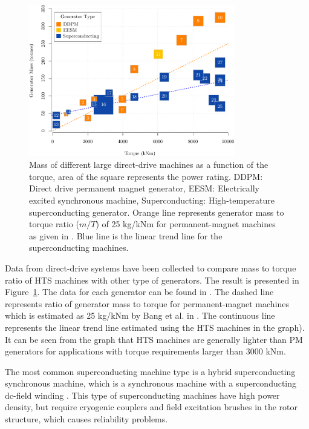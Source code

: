 \documentclass[a4paper, 11pt]{article} %
\begin{document}
 \begin{figure}[t]
    \centering
    \includegraphics[width=0.8\textwidth]{generator_mass_compare}
\caption{Mass of different large direct-drive machines as a function of the torque, area of the square represents the power rating.
 DDPM: Direct drive permanent magnet generator, EESM: Electrically excited synchronous machine, Superconducting: High-temperature superconducting generator. Orange line represents generator mass to torque ratio ($m/T$) of 25 kg/kNm for permanent-magnet machines as given in \cite{Bang2008}. Blue line is the linear trend line for the superconducting machines.}
    \label{generator_mass_compare}
  \end{figure}

Data from direct-drive systems have been collected to compare mass to torque ratio of HTS machines with other type of generators. The result is presented in Figure~\ref{generator_mass_compare}. The data for each generator can be found in \cite{Keysan2011b}. The dashed line represents ratio of generator mass to torque for permanent-magnet machines which is estimated as 25 kg/kNm by Bang et al. in \cite{Bang2008}. The continuous line represents the linear trend line estimated using the HTS machines in the graph). It can be seen from the graph that HTS machines are generally lighter than PM generators for applications with torque requirements larger than 3000 kNm. 


The most common superconducting machine type is a hybrid superconducting synchronous machine, which is a synchronous machine with a superconducting dc-field winding \cite{Kalsi2013,Gieras2008a}.  This type of superconducting machines have high power density, but require cryogenic couplers and field excitation brushes in the rotor structure, which causes reliability problems. 
\end{document}

